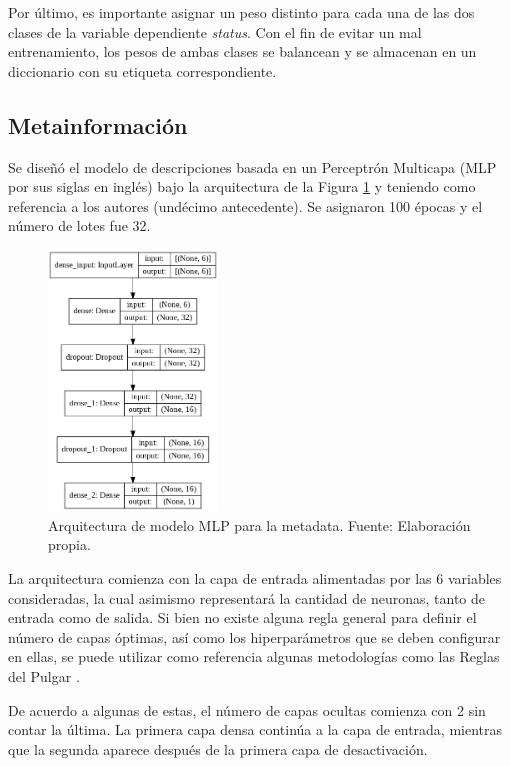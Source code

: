 Por último, es importante asignar un peso distinto para cada una de las dos clases de la variable dependiente \textit{status}. Con el fin de evitar un mal entrenamiento, los pesos de ambas clases se balancean y se almacenan en un diccionario con su etiqueta correspondiente.

\subsection{Metainformación}
Se diseñó el modelo de descripciones basada en un Perceptrón Multicapa (MLP por sus siglas en inglés) bajo la arquitectura de la Figura \ref{4:fig35} y teniendo como referencia a los autores \citeauthor{pr_yu2018deeplearning} (undécimo antecedente). Se asignaron 100 épocas y el número de lotes fue 32.

\begin{figure}[!ht]
	\begin{center}
		\includegraphics[width=0.40\textwidth]{4/figures/model_mlp_metadata.png}
		\caption{Arquitectura de modelo MLP para la metadata. Fuente: Elaboración propia.}
		\label{4:fig35}
	\end{center}
\end{figure}

La arquitectura comienza con la capa de entrada alimentadas por las 6 variables consideradas, la cual asimismo representará la cantidad de neuronas, tanto de entrada como de salida.
Si bien no existe alguna regla general para definir el número de capas óptimas, así como los hiperparámetros que se deben configurar en ellas, se puede utilizar como referencia algunas metodologías como las Reglas del Pulgar \parencite{tec_ranjan2019thumbrules}.

De acuerdo a algunas de estas, el número de capas ocultas comienza con 2 sin contar la última. La primera capa densa continúa a la capa de entrada, mientras que la segunda aparece después de la primera capa de desactivación.

